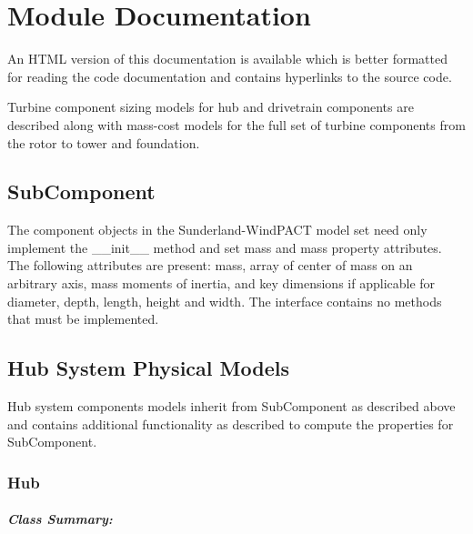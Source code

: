 \documentclass[letterpaper,10pt,openany,oneside]{sphinxmanual}
\begin{document}
\chapter{Module Documentation}
\label{documentation::doc}\label{documentation:module-documentation}
An HTML version of this documentation is available which is better formatted for reading the code documentation and contains hyperlinks to the source code.

Turbine component sizing models for hub and drivetrain components are described along with mass-cost models for the full set of turbine components from the rotor to tower and foundation.


\section{SubComponent}
\label{documentation:subcomponent}
The component objects in the Sunderland-WindPACT model set need only implement the \_\_init\_\_ method and set mass and mass property attributes.  The following attributes are present: mass, array of center of mass on an arbitrary axis, mass moments of inertia, and key dimensions if applicable for diameter, depth, length, height and width.  The interface contains no methods that must be implemented.


\section{Hub System Physical Models}
\label{documentation:hub-system-physical-models}
Hub system components models inherit from SubComponent as described above and contains additional functionality as described to compute the properties for SubComponent.


\subsection{Hub}
\label{documentation:hub-class-label}\label{documentation:hub}\paragraph{Class Summary:}
\end{document}

